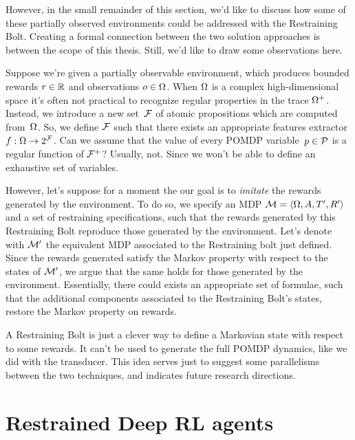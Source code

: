 However, in the small remainder of this section, we'd like to discuss how some
of these partially observed environments could be addressed with the
Restraining Bolt. Creating a formal connection between the two solution
approaches is between the scope of this thesis. Still, we'd like to draw some
observations here.

Suppose we're given a partially observable environment, which produces bounded
rewards $r \in \mathbb{R}$ and observations $o \in \Omega$. When $\Omega$ is a complex
high-dimensional space it's often not practical to recognize regular
properties in the trace $\Omega^+$. Instead, we introduce a new set~$\mathcal{F}$
of atomic propositions which are computed from~$\Omega$. So, we define
$\mathcal{F}$ such that there exists an appropriate features extractor $f: \Omega
\to 2^{\mathcal{F}}$.  Can we assume that the value of every POMDP variable~$p \in
\mathcal{P}$ is a regular function of $\mathcal{F}^+$? Usually, not. Since we
won't be able to define an exhaustive set of variables.

However, let's suppose for a moment the our goal is to \emph{imitate} the
rewards generated by the environment. To do so, we specify an MDP $\mathcal{M} =
\langle \Omega, A, T', R' \rangle$ and a set of \ldl{} restraining
specifications, such that the rewards generated by this Restraining Bolt
reproduce those generated by the environment. Let's denote with $\mathcal{M}'$
the equivalent MDP associated to the Restraining bolt just defined. Since the
rewards generated satisfy the Markov property with respect to the states of
$\mathcal{M}'$, we argue that the same holds for those generated by the
environment. Essentially, there could exists an appropriate set of \ldl{}
formulae, such that the additional components associated to the Restraining
Bolt's states, restore the Markov property on rewards.

% 
A Restraining Bolt is just a clever way to define a Markovian state with
respect to some \ldl{} rewards. It can't be used to generate the full POMDP
dynamics, like we did with the transducer. This idea serves just to suggest
some parallelisms between the two techniques, and indicates future research
directions.


\section{Restrained Deep RL agents}

\label{sec:rb-deep-model}

